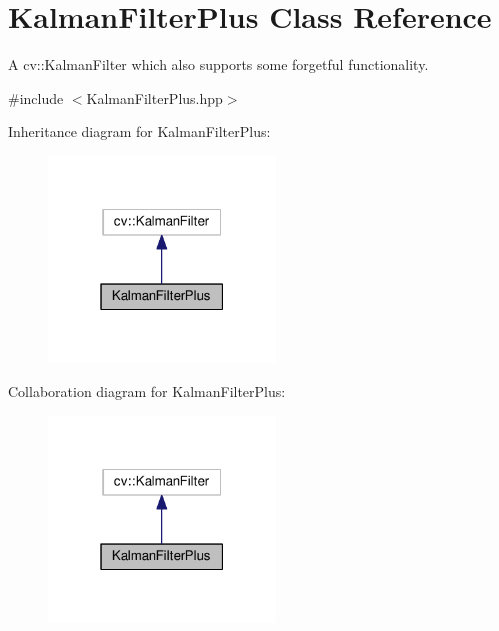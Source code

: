 \hypertarget{classKalmanFilterPlus}{}\section{Kalman\+Filter\+Plus Class Reference}
\label{classKalmanFilterPlus}


A cv\+::\+Kalman\+Filter which also supports some \textquotesingle{}forgetful\textquotesingle{} functionality.  




{\ttfamily \#include $<$Kalman\+Filter\+Plus.\+hpp$>$}



Inheritance diagram for Kalman\+Filter\+Plus\+:\nopagebreak
\begin{figure}[H]
\begin{center}
\leavevmode
\includegraphics[width=171pt]{classKalmanFilterPlus__inherit__graph}
\end{center}
\end{figure}


Collaboration diagram for Kalman\+Filter\+Plus\+:\nopagebreak
\begin{figure}[H]
\begin{center}
\leavevmode
\includegraphics[width=171pt]{classKalmanFilterPlus__coll__graph}
\end{center}
\end{figure}
